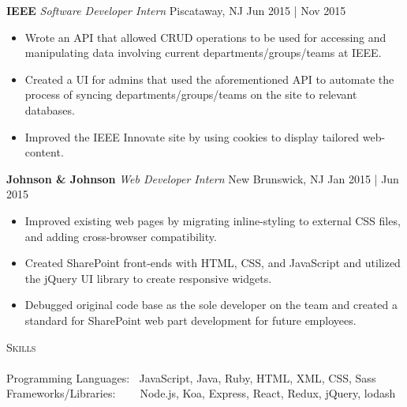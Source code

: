 \documentclass{article}
\newcommand{\lineunder} {
    \vspace*{-8pt} \\
    \hspace*{-18pt} \hrulefill \\
}
\newcommand{\header} [1] {
    {\hspace*{-18pt}\vspace*{6pt} \textsc{#1}}
    \vspace*{-6pt} \lineunder
}
\begin{document}
        \vspace{1mm}

        \textbf{IEEE} \hfill \textit{Software Developer Intern} \hfill Piscataway, NJ \hfill Jun 2015 | Nov 2015 \\
        \begin{itemize} \itemsep 3pt
            \item Wrote an API that allowed CRUD operations to be used for accessing and manipulating data involving current departments/groups/teams at IEEE.
            \item Created a UI for admins that used the aforementioned API to automate the process of syncing departments/groups/teams on the site to relevant databases.
            \item Improved the IEEE Innovate site by using cookies to display tailored web-content.
        \end{itemize}

        \vspace{1mm}

        \textbf{Johnson \& Johnson} \hfill \textit{Web Developer Intern} \hfill New Brunswick, NJ \hfill Jan 2015 | Jun 2015 \\
        \begin{itemize} \itemsep 3pt
            \item Improved existing web pages by migrating inline-styling to external CSS files, and adding cross-browser compatibility.
            \item Created SharePoint front-ends with HTML, CSS, and JavaScript and utilized the jQuery UI library to create responsive widgets.
            \item Debugged original code base as the sole developer on the team and created a standard for SharePoint web part development for future employees.
        \end{itemize}

        \vspace{1mm}



    \header{Skills}

    {Programming Languages:} $\:$ JavaScript, Java, Ruby, HTML, XML, CSS, Sass \vspace{1mm}
    {\\Frameworks/Libraries:} $\:$ $\:$ $\:$ $\:$Node.js, Koa, Express, React, Redux, jQuery, lodash

    \vspace{4mm}
\end{document}
